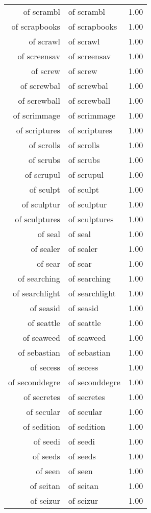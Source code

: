 \begin{table}[ht]
\begin{tabular}{rlr}
  of scrambl & of scrambl & 1.00 \\ 
  of scrapbooks & of scrapbooks & 1.00 \\ 
  of scrawl & of scrawl & 1.00 \\ 
  of screensav & of screensav & 1.00 \\ 
  of screw & of screw & 1.00 \\ 
  of screwbal & of screwbal & 1.00 \\ 
  of screwball & of screwball & 1.00 \\ 
  of scrimmage & of scrimmage & 1.00 \\ 
  of scriptures & of scriptures & 1.00 \\ 
  of scrolls & of scrolls & 1.00 \\ 
  of scrubs & of scrubs & 1.00 \\ 
  of scrupul & of scrupul & 1.00 \\ 
  of sculpt & of sculpt & 1.00 \\ 
  of sculptur & of sculptur & 1.00 \\ 
  of sculptures & of sculptures & 1.00 \\ 
  of seal & of seal & 1.00 \\ 
  of sealer & of sealer & 1.00 \\ 
  of sear & of sear & 1.00 \\ 
  of searching & of searching & 1.00 \\ 
  of searchlight & of searchlight & 1.00 \\ 
  of seasid & of seasid & 1.00 \\ 
  of seattle & of seattle & 1.00 \\ 
  of seaweed & of seaweed & 1.00 \\ 
  of sebastian & of sebastian & 1.00 \\ 
  of secess & of secess & 1.00 \\ 
  of seconddegre & of seconddegre & 1.00 \\ 
  of secretes & of secretes & 1.00 \\ 
  of secular & of secular & 1.00 \\ 
  of sedition & of sedition & 1.00 \\ 
  of seedi & of seedi & 1.00 \\ 
  of seeds & of seeds & 1.00 \\ 
  of seen & of seen & 1.00 \\ 
  of seitan & of seitan & 1.00 \\ 
  of seizur & of seizur & 1.00 \\ 

\end{tabular}
\end{table}
